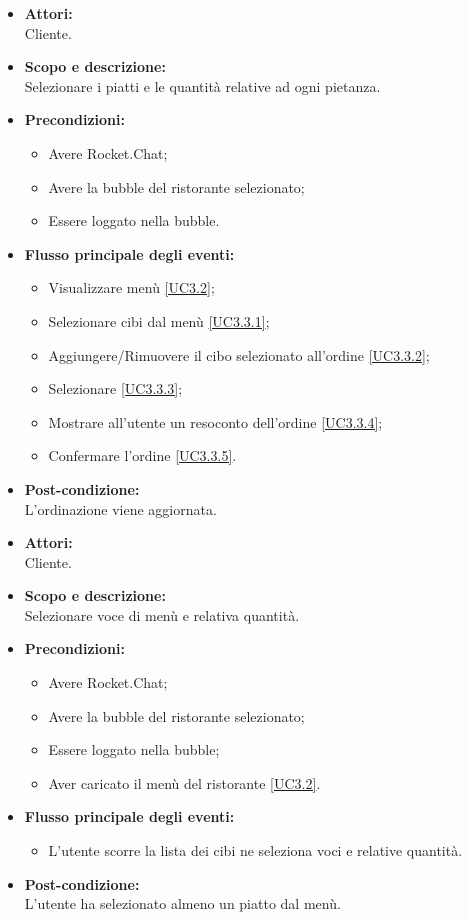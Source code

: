 \begin{itemize}
	\item \textbf{Attori:}
	\\Cliente.
	\item \textbf{Scopo e descrizione:} 
	\\Selezionare i piatti e le quantità relative ad ogni pietanza.
	\item \textbf{Precondizioni:}
	\begin{itemize}
		\item Avere Rocket.Chat;
		\item Avere la bubble del ristorante selezionato;
		\item Essere loggato nella bubble.
	\end{itemize}
	\item \textbf{Flusso principale degli eventi:}
	\begin{itemize}
		\item Visualizzare menù \ref{UC3.2};
		\item Selezionare cibi dal menù \ref{UC3.3.1};
		\item Aggiungere/Rimuovere il cibo selezionato all'ordine \ref{UC3.3.2};
		\item Selezionare  \ref{UC3.3.3};
		\item Mostrare all'utente un resoconto dell'ordine \ref{UC3.3.4};
		\item Confermare l'ordine \ref{UC3.3.5}.
	\end{itemize}
	\item \textbf{Post-condizione:}
	\\L'ordinazione viene aggiornata.
\end{itemize}


\begin{itemize}
	\item \textbf{Attori:}
	\\Cliente.
	\item \textbf{Scopo e descrizione:} 
	\\Selezionare voce di menù e relativa quantità.
	\item \textbf{Precondizioni:}
	\begin{itemize}
		\item Avere Rocket.Chat;
		\item Avere la bubble del ristorante selezionato;
		\item Essere loggato nella bubble;
		\item Aver caricato il menù del ristorante \ref{UC3.2}.
	\end{itemize}
	\item \textbf{Flusso principale degli eventi:}
	\begin{itemize}
		\item L'utente scorre la lista dei cibi ne seleziona voci e relative quantità.
	\end{itemize}
	\item \textbf{Post-condizione:}
	\\L'utente ha selezionato almeno un piatto dal menù.
\end{itemize}

